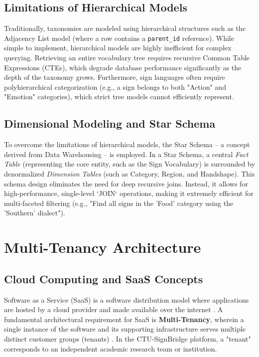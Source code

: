 \subsection{Limitations of Hierarchical Models}
Traditionally, taxonomies are modeled using hierarchical structures such as the Adjacency List model (where a row contains a \texttt{parent\_id} reference). While simple to implement, hierarchical models are highly inefficient for complex querying. Retrieving an entire vocabulary tree requires recursive Common Table Expressions (CTEs), which degrade database performance significantly as the depth of the taxonomy grows. Furthermore, sign languages often require polyhierarchical categorization (e.g., a sign belongs to both "Action" and "Emotion" categories), which strict tree models cannot efficiently represent.

\subsection{Dimensional Modeling and Star Schema}
To overcome the limitations of hierarchical models, the Star Schema -- a concept derived from Data Warehousing -- is employed. In a Star Schema, a central \textit{Fact Table} (representing the core entity, such as the Sign Vocabulary) is surrounded by denormalized \textit{Dimension Tables} (such as Category, Region, and Handshape). 
This schema design eliminates the need for deep recursive joins. Instead, it allows for high-performance, single-level `JOIN` operations, making it extremely efficient for multi-faceted filtering (e.g., "Find all signs in the 'Food' category using the 'Southern' dialect").

\section{Multi-Tenancy Architecture}
\subsection{Cloud Computing and SaaS Concepts}
Software as a Service (SaaS) is a software distribution model where applications are hosted by a cloud provider and made available over the internet \cite{schroeter2012enabling}. A fundamental architectural requirement for SaaS is \textbf{Multi-Tenancy}, wherein a single instance of the software and its supporting infrastructure serves multiple distinct customer groups (tenants) \cite{bezemer2010multi, wu2014tossma}. In the CTU-SignBridge platform, a "tenant" corresponds to an independent academic research team or institution.

